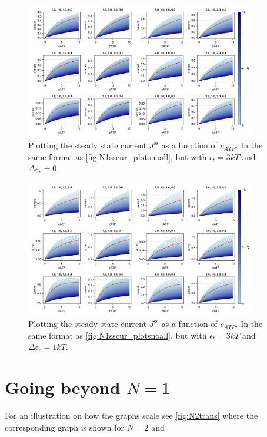 \documentclass[11pt]{article}
\begin{document}
\begin{figure}[H]
	\centering
	\includegraphics[width=0.9\textwidth]{../../plots/N1sym/sscurs_et=3_der=0.png}
	\caption{
		Plotting the steady state current $J^\text{ss}$ as a function of $c_{ATP}$.
		In the same format as \cref{fig:N1sscur_plotsnoall}, but with $\epsilon_t=3\si{k}T$ and $\Delta\epsilon_r=0$.
	}\label{fig:N1sscur_plots2}
\end{figure}

\begin{figure}[H]
	\centering
	\includegraphics[width=0.9\textwidth]{../../plots/N1sym/sscurs_et=3_der=1.png}
	\caption{
		Plotting the steady state current $J^\text{ss}$ as a function of $c_{ATP}$.
		In the same format as \cref{fig:N1sscur_plotsnoall}, but with $\epsilon_t=3\si{k}T$ and $\Delta\epsilon_r=1\si{k}T$.
	}\label{fig:N1sscur_plots3}
\end{figure}

\newpage
\section{Going beyond $N=1$}
For an illustration on how the graphs scale see \cref{fig:N2trans} where the corresponding graph is shown for $N=2$ and
\end{document}
